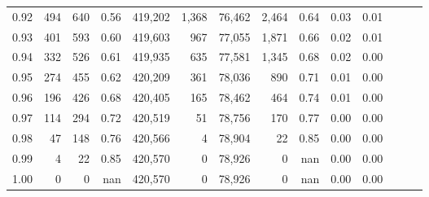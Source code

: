 \begin{tabular}{rrrrrrrrrrrrrr}
0.92 &    494 &    640 &  0.56 &  419,202 &    1,368 &  76,462 &   2,464 &  0.64 &  0.03 &      0.01 \\
0.93 &    401 &    593 &  0.60 &  419,603 &      967 &  77,055 &   1,871 &  0.66 &  0.02 &      0.01 \\
0.94 &    332 &    526 &  0.61 &  419,935 &      635 &  77,581 &   1,345 &  0.68 &  0.02 &      0.00 \\
0.95 &    274 &    455 &  0.62 &  420,209 &      361 &  78,036 &     890 &  0.71 &  0.01 &      0.00 \\
0.96 &    196 &    426 &  0.68 &  420,405 &      165 &  78,462 &     464 &  0.74 &  0.01 &      0.00 \\
0.97 &    114 &    294 &  0.72 &  420,519 &       51 &  78,756 &     170 &  0.77 &  0.00 &      0.00 \\
0.98 &     47 &    148 &  0.76 &  420,566 &        4 &  78,904 &      22 &  0.85 &  0.00 &      0.00 \\
0.99 &      4 &     22 &  0.85 &  420,570 &        0 &  78,926 &       0 &   nan &  0.00 &      0.00 \\
1.00 &      0 &      0 &   nan &  420,570 &        0 &  78,926 &       0 &   nan &  0.00 &      0.00 \\
\bottomrule
\end{tabular}
